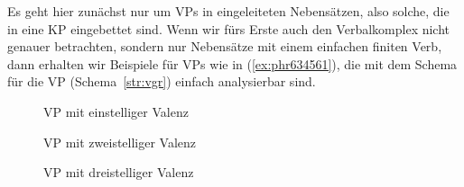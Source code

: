 \begin{exe}
\end{exe}

Es geht hier zunächst nur um VPs in eingeleiteten Nebensätzen, also solche, die in eine KP eingebettet sind.
Wenn wir fürs Erste auch den Verbalkomplex nicht genauer betrachten, sondern nur Nebensätze mit einem einfachen finiten Verb, dann erhalten wir Beispiele für VPs wie in (\ref{ex:phr634561}), die mit dem Schema für die VP (Schema~\ref{str:vgr}) einfach analysierbar sind.

\begin{exe}
\ex\label{ex:phr634561}\begin{xlist}
\end{xlist} 
\end{exe}

\begin{figure}
  \centering
  \caption{VP mit einstelliger Valenz}
  \label{fig:vgreinstellig}
\end{figure}

\begin{figure}
  \centering
  \caption{VP mit zweistelliger Valenz}
  \label{fig:vgrzweistellig}
\end{figure}

\begin{figure}
  \centering
  \caption{VP mit dreistelliger Valenz}
  \label{fig:vgrdreistellig}
\end{figure}

